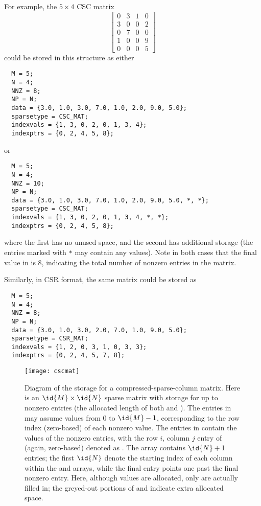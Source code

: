 For example, the $5\times 4$ CSC matrix
\[
  \left[\begin{array}{cccc} 
     0 & 3 & 1 & 0\\
     3 & 0 & 0 & 2\\
     0 & 7 & 0 & 0\\
     1 & 0 & 0 & 9\\
     0 & 0 & 0 & 5
  \end{array}\right]
\]
could be stored in this structure as either
\begin{verbatim}
  M = 5;
  N = 4;
  NNZ = 8;
  NP = N;
  data = {3.0, 1.0, 3.0, 7.0, 1.0, 2.0, 9.0, 5.0};
  sparsetype = CSC_MAT;
  indexvals = {1, 3, 0, 2, 0, 1, 3, 4};
  indexptrs = {0, 2, 4, 5, 8};
\end{verbatim}
or 
\begin{verbatim}
  M = 5;
  N = 4;
  NNZ = 10;
  NP = N;
  data = {3.0, 1.0, 3.0, 7.0, 1.0, 2.0, 9.0, 5.0, *, *};
  sparsetype = CSC_MAT;
  indexvals = {1, 3, 0, 2, 0, 1, 3, 4, *, *};
  indexptrs = {0, 2, 4, 5, 8};
\end{verbatim}
where the first has no unused space, and the second has additional
storage (the entries marked with \texttt{*} may contain any values).
Note in both cases that the final value in  is $8$,
indicating the total number of nonzero entries in the matrix.

Similarly, in CSR format, the same matrix could be stored as
\begin{verbatim}
  M = 5;
  N = 4;
  NNZ = 8;
  NP = N;
  data = {3.0, 1.0, 3.0, 2.0, 7.0, 1.0, 9.0, 5.0};
  sparsetype = CSR_MAT;
  indexvals = {1, 2, 0, 3, 1, 0, 3, 3};
  indexptrs = {0, 2, 4, 5, 7, 8};
\end{verbatim}

\begin{figure}
\centerline{\texttt{[image: cscmat]}}
\caption[Diagram of the storage for a compressed-sparse-column matrix] 
  {Diagram of the storage for a compressed-sparse-column
  matrix. Here  is an $\id{M} \times \id{N}$ sparse matrix with storage
  for up to  nonzero entries (the allocated length of
  both  and ).  The entries in 
  may assume values from $0$ to $\id{M}-1$, corresponding to the row index
  (zero-based) of each nonzero value.  The entries in  contain
  the values of the nonzero entries, with the row $i$, column $j$
  entry of  (again, zero-based) denoted as .
  The  array contains $\id{N}+1$ entries; the first $\id{N}$
  denote the starting index of each column within the 
  and  arrays, while the final entry points one past the
  final nonzero entry.  Here, although  values are allocated,
  only  are actually filled in; the greyed-out portions
  of  and  indicate extra allocated
  space.}\label{f:sparsemat} 
\end{figure}

